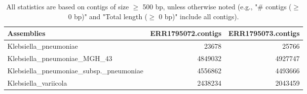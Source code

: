 \documentclass[12pt,a4paper]{article}
\begin{document}
\begin{table}[ht]
\begin{center}
\caption{All statistics are based on contigs of size $\geq$ 500 bp, unless otherwise noted (e.g., "\# contigs ($\geq$ 0 bp)" and "Total length ($\geq$ 0 bp)" include all contigs).}
\begin{tabular}{|l*{2}{|r}|}
\hline
Assemblies & ERR1795072.contigs & ERR1795073.contigs \\ \hline
Klebsiella\_pneumoniae & 23678 & 25766 \\ \hline
Klebsiella\_pneumoniae\_MGH\_43 & 4849032 & 4927747 \\ \hline
Klebsiella\_pneumoniae\_subsp.\_pneumoniae & 4556862 & 4493666 \\ \hline
Klebsiella\_variicola & 2438234 & 2043459 \\ \hline
\end{tabular}
\end{center}
\end{table}
\end{document}
